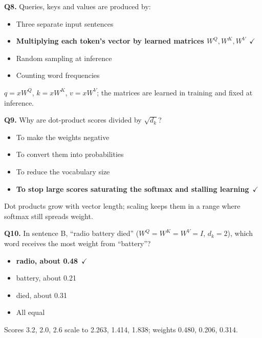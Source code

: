 \documentclass[11pt]{article}
\begin{document}
{\noindent\textbf{Q8.} Queries, keys and values are produced by:\begin{itemize}[leftmargin=2.2em,itemsep=0pt,topsep=1pt]\item[A.] Three separate input sentences\item[\textbf{B.}] \textbf{Multiplying each token's vector by learned matrices $W^Q,W^K,W^V$}~{\color{GrnN}$\checkmark$}\item[C.] Random sampling at inference\item[D.] Counting word frequencies\end{itemize} $q=xW^Q$, $k=xW^K$, $v=xW^V$; the matrices are learned in training and fixed at inference.\par\medskip

\noindent\textbf{Q9.} Why are dot-product scores divided by $\sqrt{d_k}$?\begin{itemize}[leftmargin=2.2em,itemsep=0pt,topsep=1pt]\item[A.] To make the weights negative\item[B.] To convert them into probabilities\item[C.] To reduce the vocabulary size\item[\textbf{D.}] \textbf{To stop large scores saturating the softmax and stalling learning}~{\color{GrnN}$\checkmark$}\end{itemize} Dot products grow with vector length; scaling keeps them in a range where softmax still spreads weight.\par\medskip

\noindent\textbf{Q10.} In sentence B, ``radio battery died'' ($W^Q=W^K=W^V=I$, $d_k=2$), which word receives the most weight from ``battery''?\begin{itemize}[leftmargin=2.2em,itemsep=0pt,topsep=1pt]\item[\textbf{A.}] \textbf{radio, about 0.48}~{\color{GrnN}$\checkmark$}\item[B.] battery, about 0.21\item[C.] died, about 0.31\item[D.] All equal\end{itemize} Scores 3.2, 2.0, 2.6 scale to 2.263, 1.414, 1.838; weights 0.480, 0.206, 0.314.\par\medskip

}
\end{document}
